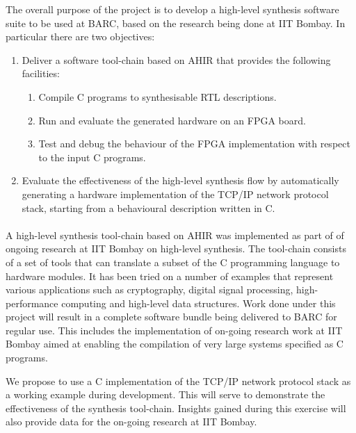 \documentclass[12pt]{article}
\begin{document}
\incten


The overall purpose of the project is to develop a high-level
synthesis software suite to be used at BARC, based on the research
being done at IIT Bombay. In particular there are two objectives:

\begin{enumerate}
\item Deliver a software tool-chain based on AHIR that provides the
  following facilities:
  \begin{enumerate}
  \item Compile C programs to synthesisable RTL descriptions.
  \item Run and evaluate the generated hardware on an FPGA board.
  \item Test and debug the behaviour of the FPGA implementation with
    respect to the input C programs.
  \end{enumerate}

\item Evaluate the effectiveness of the high-level synthesis flow by
  automatically generating a hardware implementation of the TCP/IP
  network protocol stack, starting from a behavioural description
  written in C.
\end{enumerate}


\paragraph{} A high-level synthesis tool-chain based on AHIR was
implemented as part of of ongoing research at IIT Bombay on high-level
synthesis. The tool-chain consists of a set of tools that can
translate a subset of the C programming language to hardware modules.
It has been tried on a number of examples that represent various
applications such as cryptography, digital signal processing,
high-performance computing and high-level data structures. Work done
under this project will result in a complete software bundle being
delivered to BARC for regular use. This includes the implementation of
on-going research work at IIT Bombay aimed at enabling the compilation
of very large systems specified as C programs.

We propose to use a C implementation of the TCP/IP network protocol
stack as a working example during development. This will serve to
demonstrate the effectiveness of the synthesis tool-chain. Insights
gained during this exercise will also provide data for the on-going
research at IIT Bombay.
\end{document}
